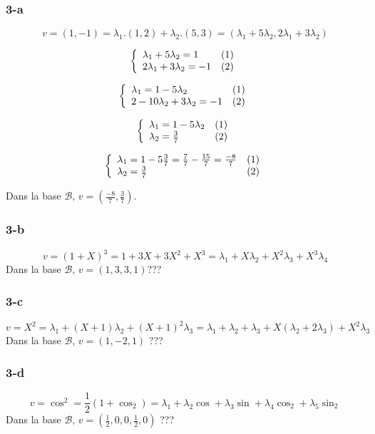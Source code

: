 \documentclass[]{book}
\theoremstyle{definition}
\begin{document}
\subsubsection*{3-a}
$$v = (1,-1)= \lambda_1.(1,2) + \lambda_2.(5,3) = (\lambda_1+5\lambda_2,2\lambda_1+3\lambda_2)$$

$$
\left\{ 
\begin{array}{l l}
\lambda_1+5\lambda_2 = 1 & (1)\\
2\lambda_1+3\lambda_2 = -1 & (2)\\
\end{array}
\right. 
$$ 

$$
\left\{ 
\begin{array}{l l}
\lambda_1 = 1 - 5\lambda_2 & (1)\\
2-10\lambda_2+3\lambda_2 = -1 & (2)\\
\end{array}
\right. 
$$ 

$$
\left\{ 
\begin{array}{l l}
\lambda_1 = 1 - 5\lambda_2 & (1)\\
\lambda_2 = \frac{3}{7} & (2)\\
\end{array}
\right. 
$$ 

$$
\left\{ 
\begin{array}{l l}
\lambda_1 = 1 - 5\frac{3}{7} = \frac{7}{7}- \frac{15}{7} = \frac{-8}{7}& (1)\\
\lambda_2 = \frac{3}{7} & (2)\\
\end{array}
\right. 
$$ 

Dans la base $\mathcal{B}$, $v=(\frac{-8}{7},\frac{3}{7})$.

\subsubsection*{3-b}
$$v=(1+X)^3 = 1+3X+3X^2+X^3 = \lambda_1 + X\lambda_2 + X^2\lambda_3 + X^3\lambda_4$$
Dans la base $\mathcal{B}$, $v=(1,3,3,1)$???

\subsubsection*{3-c}
$$v=X^2 = \lambda_1 + (X+1)\lambda_2 + (X+1)^2\lambda_3 = \lambda_1+\lambda_2+\lambda_3 +X(\lambda_2+2\lambda_3) + X^2\lambda_3$$
Dans la base $\mathcal{B}$, $v=(1,-2,1)$ ???

\subsubsection*{3-d}
$$v=\cos^2 = \frac{1}{2}(1+\cos_2) = \lambda_1 + \lambda_2 \cos + \lambda_3 \sin + \lambda_4 \cos_2 + \lambda_5 \sin_2 $$
Dans la base $\mathcal{B}$, $v=(\frac{1}{2},0,0,\frac{1}{2},0)$ ???
\end{document}
